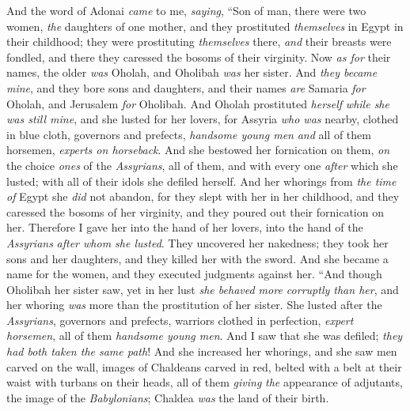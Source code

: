 \begin{biblechapter} %
 And the word of Adonai \textit{came} to me, \textit{saying},
\verse “Son of man, there were two women, \textit{the} daughters of one mother,
\verse and they prostituted \textit{themselves} in Egypt in their childhood; they were prostituting \textit{themselves} there, \textit{and} their breasts were fondled, and there they caressed the bosoms of their virginity.
\verse Now \textit{as for} their names, the older \textit{was} Oholah, and Oholibah \textit{was} her sister. And \textit{they became mine}, and they bore sons and daughters, and their names \textit{are} Samaria \textit{for} Oholah, and Jerusalem \textit{for} Oholibah.
\verse And Oholah prostituted \textit{herself} \textit{while she was still mine}, and she lusted for her lovers, for Assyria \textit{who was} nearby,
\verse clothed in blue cloth, governors and prefects, \textit{handsome young men} \textit{and} all of them horsemen, \textit{experts on horseback}.
\verse And she bestowed her fornication on them, \textit{on} the choice \textit{ones} of the \textit{Assyrians}, all of them, and with every one \textit{after} which she lusted; with all of their idols she defiled herself.
\verse And her whorings from \textit{the time of} Egypt she \textit{did} not abandon, for they slept with her in her childhood, and they caressed the bosoms of her virginity, and they poured out their fornication on her.
\verse Therefore I gave her into the hand of her lovers, into the hand of the \textit{Assyrians} \textit{after whom she lusted}.
\verse They uncovered her nakedness; they took her sons and her daughters, and they killed her with the sword. And she became a name for the women, and they executed judgments against her.
\verse “And though Oholibah her sister saw, yet in her lust \textit{she behaved more corruptly than her}, and her whoring \textit{was} more than the prostitution of her sister.
\verse She lusted after the \textit{Assyrians}, governors and prefects, warriors clothed in perfection, \textit{expert horsemen}, all of them \textit{handsome young men}.
\verse And I saw that she was defiled; \textit{they had both taken the same path}!
\verse And she increased her whorings, and she saw men carved on the wall, images of Chaldeans carved in red,
\verse belted with a belt at their waist with turbans on their heads, all of them \textit{giving} \textit{the} appearance of adjutants, the image of the \textit{Babylonians}; Chaldea \textit{was} the land of their birth.

\end{biblechapter}
